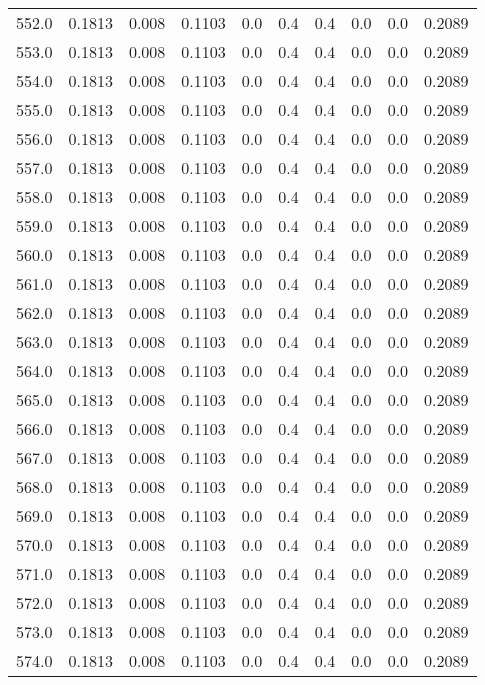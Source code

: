 \begin{longtable}{lrrrrrrrrr}
552.0 & 0.1813 & 0.008 & 0.1103 & 0.0 & 0.4 & 0.4 & 0.0 & 0.0 & 0.2089 \\
553.0 & 0.1813 & 0.008 & 0.1103 & 0.0 & 0.4 & 0.4 & 0.0 & 0.0 & 0.2089 \\
554.0 & 0.1813 & 0.008 & 0.1103 & 0.0 & 0.4 & 0.4 & 0.0 & 0.0 & 0.2089 \\
555.0 & 0.1813 & 0.008 & 0.1103 & 0.0 & 0.4 & 0.4 & 0.0 & 0.0 & 0.2089 \\
556.0 & 0.1813 & 0.008 & 0.1103 & 0.0 & 0.4 & 0.4 & 0.0 & 0.0 & 0.2089 \\
557.0 & 0.1813 & 0.008 & 0.1103 & 0.0 & 0.4 & 0.4 & 0.0 & 0.0 & 0.2089 \\
558.0 & 0.1813 & 0.008 & 0.1103 & 0.0 & 0.4 & 0.4 & 0.0 & 0.0 & 0.2089 \\
559.0 & 0.1813 & 0.008 & 0.1103 & 0.0 & 0.4 & 0.4 & 0.0 & 0.0 & 0.2089 \\
560.0 & 0.1813 & 0.008 & 0.1103 & 0.0 & 0.4 & 0.4 & 0.0 & 0.0 & 0.2089 \\
561.0 & 0.1813 & 0.008 & 0.1103 & 0.0 & 0.4 & 0.4 & 0.0 & 0.0 & 0.2089 \\
562.0 & 0.1813 & 0.008 & 0.1103 & 0.0 & 0.4 & 0.4 & 0.0 & 0.0 & 0.2089 \\
563.0 & 0.1813 & 0.008 & 0.1103 & 0.0 & 0.4 & 0.4 & 0.0 & 0.0 & 0.2089 \\
564.0 & 0.1813 & 0.008 & 0.1103 & 0.0 & 0.4 & 0.4 & 0.0 & 0.0 & 0.2089 \\
565.0 & 0.1813 & 0.008 & 0.1103 & 0.0 & 0.4 & 0.4 & 0.0 & 0.0 & 0.2089 \\
566.0 & 0.1813 & 0.008 & 0.1103 & 0.0 & 0.4 & 0.4 & 0.0 & 0.0 & 0.2089 \\
567.0 & 0.1813 & 0.008 & 0.1103 & 0.0 & 0.4 & 0.4 & 0.0 & 0.0 & 0.2089 \\
568.0 & 0.1813 & 0.008 & 0.1103 & 0.0 & 0.4 & 0.4 & 0.0 & 0.0 & 0.2089 \\
569.0 & 0.1813 & 0.008 & 0.1103 & 0.0 & 0.4 & 0.4 & 0.0 & 0.0 & 0.2089 \\
570.0 & 0.1813 & 0.008 & 0.1103 & 0.0 & 0.4 & 0.4 & 0.0 & 0.0 & 0.2089 \\
571.0 & 0.1813 & 0.008 & 0.1103 & 0.0 & 0.4 & 0.4 & 0.0 & 0.0 & 0.2089 \\
572.0 & 0.1813 & 0.008 & 0.1103 & 0.0 & 0.4 & 0.4 & 0.0 & 0.0 & 0.2089 \\
573.0 & 0.1813 & 0.008 & 0.1103 & 0.0 & 0.4 & 0.4 & 0.0 & 0.0 & 0.2089 \\
574.0 & 0.1813 & 0.008 & 0.1103 & 0.0 & 0.4 & 0.4 & 0.0 & 0.0 & 0.2089 \\

\end{longtable}
